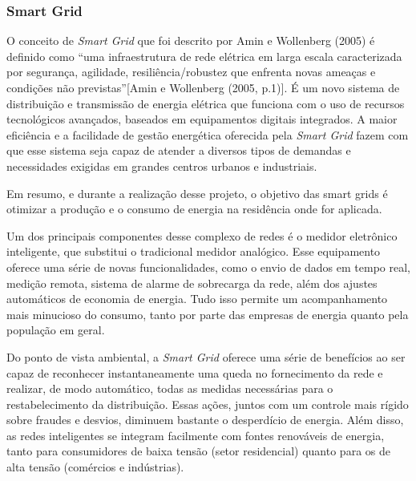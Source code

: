             \subsubsection{Smart Grid}
                \par O conceito de \textit{Smart Grid} que foi descrito por Amin e Wollenberg (2005) é definido como “uma infraestrutura de rede elétrica em larga escala caracterizada por segurança, agilidade, resiliência/robustez que enfrenta novas ameaças e condições não previstas”[Amin e Wollenberg (2005, p.1)]. É um novo sistema de distribuição e transmissão de energia elétrica que funciona com o uso de recursos tecnológicos avançados, baseados em equipamentos digitais integrados. A maior eficiência e a facilidade de gestão energética oferecida pela \textit{Smart Grid} fazem com que esse sistema seja capaz de atender a diversos tipos de demandas e necessidades exigidas em grandes centros urbanos e industriais. \cite{aminwollenberg2005}
                \par Em resumo, e durante a realização desse projeto, o objetivo das smart grids é otimizar a produção e o consumo de energia na residência onde for aplicada.
                \par Um dos principais componentes desse complexo de redes é o medidor eletrônico inteligente, que substitui o tradicional medidor analógico. Esse equipamento oferece uma série de novas funcionalidades, como o envio de dados em tempo real, medição remota, sistema de alarme de sobrecarga da rede, além dos ajustes automáticos de economia de energia. Tudo isso permite um acompanhamento mais minucioso do consumo, tanto por parte das empresas de energia quanto pela população em geral. \cite{ecycle}
                \par Do ponto de vista ambiental, a \textit{Smart Grid} oferece uma série de benefícios ao ser capaz de reconhecer instantaneamente uma queda no fornecimento da rede e realizar, de modo automático, todas as medidas necessárias para o restabelecimento da distribuição. Essas ações, juntos com um controle mais rígido sobre fraudes e desvios, diminuem bastante o desperdício de energia.  Além disso, as redes inteligentes se integram facilmente com fontes renováveis de energia, tanto para consumidores de baixa tensão (setor residencial) quanto para os de alta tensão (comércios e indústrias). \cite{siemens}
